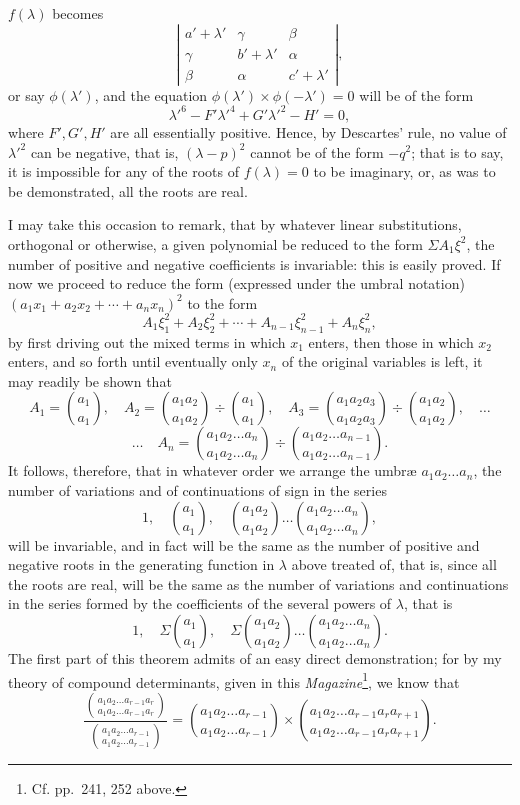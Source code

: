 \documentclass[11pt]{article}
\newcommand{\sourcepage}[1]{\marginpar{\scriptsize p.~#1}}
\begin{document}
{{\sourcepage{380}
$f(\lambda)$ becomes
\[
\left|\begin{array}{ccc}
a'+\lambda'&\gamma&\beta\\
\gamma&b'+\lambda'&\alpha\\
\beta&\alpha&c'+\lambda'
\end{array}\right|,
\]
or say $\phi(\lambda')$, and the equation $\phi(\lambda')\times\phi(-\lambda')=0$ will be of the form
\[
\lambda'^6-F'\lambda'^4+G'\lambda'^2-H'=0,
\]
where $F',G',H'$ are all essentially positive. Hence, by Descartes' rule, no value of $\lambda'^2$ can be negative, that is, $(\lambda-p)^2$ cannot be of the form $-q^2$; that is to say, it is impossible for any of the roots of $f(\lambda)=0$ to be imaginary, or, as was to be demonstrated, all the roots are real.

I may take this occasion to remark, that by whatever linear substitutions, orthogonal or otherwise, a given polynomial be reduced to the form $\Sigma A_1\xi^2$, the number of positive and negative coefficients is invariable: this is easily proved. If now we proceed to reduce the form (expressed under the umbral notation) $(a_1x_1+a_2x_2+\cdots+a_nx_n)^2$ to the form
\[
A_1\xi_1^2+A_2\xi_2^2+\cdots+A_{n-1}\xi_{n-1}^2+A_n\xi_n^2,
\]
by first driving out the mixed terms in which $x_1$ enters, then those in which $x_2$ enters, and so forth until eventually only $x_n$ of the original variables is left, it may readily be shown that
\[
A_1=\binom{a_1}{a_1},\quad
A_2=\binom{a_1a_2}{a_1a_2}\div\binom{a_1}{a_1},\quad
A_3=\binom{a_1a_2a_3}{a_1a_2a_3}\div\binom{a_1a_2}{a_1a_2},\quad\ldots
\]
\[
\ldots\quad
A_n=\binom{a_1a_2\ldots a_n}{a_1a_2\ldots a_n}\div
\binom{a_1a_2\ldots a_{n-1}}{a_1a_2\ldots a_{n-1}}.
\]
It follows, therefore, that in whatever order we arrange the umbræ $a_1a_2\ldots a_n$, the number of variations and of continuations of sign in the series
\[
1,\quad \binom{a_1}{a_1},\quad
\binom{a_1a_2}{a_1a_2}\ldots
\binom{a_1a_2\ldots a_n}{a_1a_2\ldots a_n},
\]
will be invariable, and in fact will be the same as the number of positive and negative roots in the generating function in $\lambda$ above treated of, that is, since all the roots are real, will be the same as the number of variations and continuations in the series formed by the coefficients of the several powers of $\lambda$, that is
\[
1,\quad \Sigma\binom{a_1}{a_1},\quad
\Sigma\binom{a_1a_2}{a_1a_2}\ldots
\binom{a_1a_2\ldots a_n}{a_1a_2\ldots a_n}.
\]
The first part of this theorem admits of an easy direct demonstration; for by my theory of compound determinants, given in this \emph{Magazine}\footnote{Cf. pp.~241, 252 above.}, we know that
\[
\frac{\binom{a_1a_2\ldots a_{r-1}a_r}{a_1a_2\ldots a_{r-1}a_r}}
{\binom{a_1a_2\ldots a_{r-1}}{a_1a_2\ldots a_{r-1}}}
=
\binom{a_1a_2\ldots a_{r-1}}{a_1a_2\ldots a_{r-1}}
\times
\binom{a_1a_2\ldots a_{r-1}a_ra_{r+1}}{a_1a_2\ldots a_{r-1}a_ra_{r+1}}.
\]

}}
\end{document}
